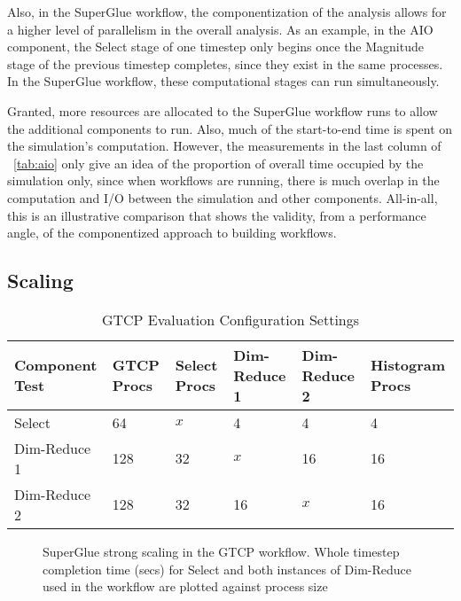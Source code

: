 Also, in the SuperGlue workflow,
the componentization of the analysis
allows for a higher level of parallelism in the overall
analysis. As an example, in the AIO component,
the Select stage of one timestep
only begins once the Magnitude
stage of the previous timestep
completes, since they exist in the same processes.
In the SuperGlue workflow, these
computational stages can run simultaneously.

Granted, more resources are allocated to the
SuperGlue workflow runs to allow the additional
components to run.
Also, much of the start-to-end time is spent on
the simulation's computation.
However, the measurements in the last column
of ~\autoref{tab:aio}
only give an idea of the proportion of 
overall time occupied by the simulation only,
since when workflows are running, there is much
overlap in the computation and I/O between the
simulation and other components.
All-in-all, this is
an illustrative comparison that shows the validity,
from a performance angle,
of the componentized approach
to building workflows.

\subsection{Scaling}

\begin{table*}[tbp]
  \centering
  \caption{GTCP Evaluation Configuration Settings}
  \label{tab:eval-strong-gtcp}
  \vspace{-0.15in}
  \begin{tabular}{|l|l|l|l|l|l|}
    \hline
    Component Test & GTCP Procs & Select Procs & Dim-Reduce 1 & Dim-Reduce 2 & Histogram Procs \\
    \hline
    Select & 64 & $x$ & 4 & 4 & 4\\
    \hline
    Dim-Reduce 1 & 128 & 32 & $x$ & 16 & 16\\
    \hline
    Dim-Reduce 2 & 128 & 32 & 16 & $x$ & 16\\
    \hline
  \end{tabular}
  \vspace{-0.07in}
\end{table*}

\begin{figure}
  \centering
  
  
  \caption{SuperGlue strong scaling in the GTCP workflow. Whole timestep
    completion time (secs) for Select and both instances of Dim-Reduce used in
    the workflow are plotted against process size}
  \label{fig:gtcp-strong}
  \vspace{-0.25in}
\end{figure}

